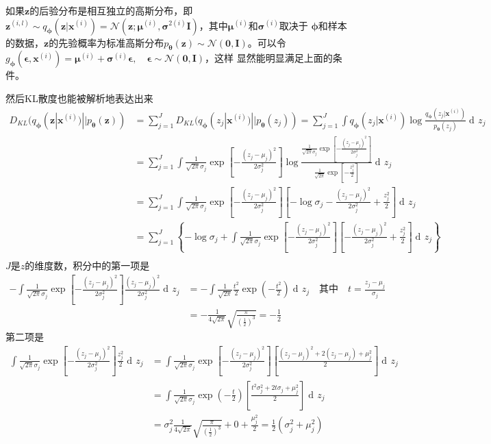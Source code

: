 \documentclass[UTF8]{ctexart}
\DeclareMathOperator\dif{d\!}
\newcommand*{\bb}[1]{\mathbf{#1}}
\begin{document}
如果$\bb z$的后验分布是相互独立的高斯分布，即$\bb z^{(i,l)}\sim q_{\bm\phi}(\bb z|\bb x^{(i)})=\mathcal{N}(\bb z;\bm \mu^{(i)},\bm \sigma^{2(i)}\bb I )$，其中$\bm \mu^{(i)}$和$\bm \sigma^{(i)}$取决于
$\bm \phi$和样本的数据，$\bb z$的先验概率为标准高斯分布$p_{\bm\theta}(\bb z)\sim \mathcal{N} (\bb 0,\bb I)$。可以令$g_{\bm \phi}(\bm\epsilon,\bb x^{(i)}) = \bm\mu^{(i)}+\bm\sigma^{(i)}\bm\epsilon,\quad\bm\epsilon\sim\mathcal{N} (\bb 0,\bb I)$，这样
显然能明显满足上面的条件。

然后KL散度也能被解析地表达出来
\begin{align*}
  D_{KL}(q_{\bm\phi}(\bb z| \bb x^{(i)})||p_{\bm\theta}(\bb z)) &=\sum^J_{j=1}D_{KL}(q_{\bm\phi}(z_j| \bb x^{(i)})||p_{\bm\theta}(z_j))
  =\sum^J_{j=1}\int q_{\bm\phi}(z_j| \bb x^{(i)})\log \frac{q_{\bm\phi}(z_j| \bb x^{(i)})}{p_{\bm\theta}(z_j)} \dif z_j\\
  &=\sum^J_{j=1}\int\frac 1{\sqrt{2\pi}\sigma_j}\exp{\left[-\frac{(z_j-\mu_j)^2}{2\sigma_j^2}\right]}\log
  \frac{\frac 1{\sqrt{2\pi}\sigma_j}\exp{\left[-\frac{(z_j-\mu_j)^2}{2\sigma_j^2}\right]}}{\frac 1{\sqrt{2\pi}}\exp{\left[-\frac{z_j^2}{2}\right]}}\dif z_j\\
  &=\sum^J_{j=1}\int\frac 1{\sqrt{2\pi}\sigma_j}\exp{\left[-\frac{(z_j-\mu_j)^2}{2\sigma_j^2}\right]}\left[-\log\sigma_j-\frac{(z_j-\mu_j)^2}{2\sigma^2_j}+\frac{z_j^2}{2}\right]\dif z_j\\
  &=\sum^J_{j=1}\left\{-\log\sigma_j+\int\frac 1{\sqrt{2\pi}\sigma_j}\exp{\left[-\frac{(z_j-\mu_j)^2}{2\sigma_j^2}\right]}\left[-\frac{(z_j-\mu_j)^2}{2\sigma^2_j}+\frac{z_j^2}{2}\right]\dif z_j\right\}\\
\end{align*}
$J$是$z$的维度数，积分中的第一项是
\begin{align*}
  -\int\frac 1{\sqrt{2\pi}\sigma_j}\exp{\left[-\frac{(z_j-\mu_j)^2}{2\sigma_j^2}\right]}\frac{(z_j-\mu_j)^2}{2\sigma^2_j}\dif z_j
  &=-\int\frac 1{\sqrt{2\pi}}\frac{t^2}{2}\exp{\left(-\frac{t^2}{2}\right)}\dif z_j \quad\text{其中}\quad t=\frac{z_j-\mu_j}{\sigma_j} \\
  &=-\frac 1{4\sqrt{2\pi}}\sqrt{\frac{\pi}{{\left(\frac{1}{2}\right)}^3}}=-\frac12
\end{align*}
第二项是
\begin{align*}
  \int\frac 1{\sqrt{2\pi}\sigma_j}\exp{\left[-\frac{(z_j-\mu_j)^2}{2\sigma_j^2}\right]}\frac{z_j^2}{2}\dif z_j
  &=\int\frac 1{\sqrt{2\pi}\sigma_j}\exp{\left[-\frac{(z_j-\mu_j)^2}{2\sigma_j^2}\right]}\left[\frac{(z_j-\mu_j)^2+2(z_j-\mu_j)+\mu_j^2}{2}\right]\dif z_j\\
  &=\int\frac 1{\sqrt{2\pi}\sigma_j}\exp{\left(-\frac{t}2\right)}\left[\frac{t^2\sigma_j^2+2t\sigma_j+\mu_j^2}{2}\right]\dif z_j\\
  &=\sigma_j^2\frac 1{4\sqrt{2\pi}}\sqrt{\frac{\pi}{{\left(\frac{1}{2}\right)}^3}}+0+\frac{\mu^2_j}{2}
  =\frac12(\sigma_j^2+\mu^2_j)
\end{align*}
\end{document}
